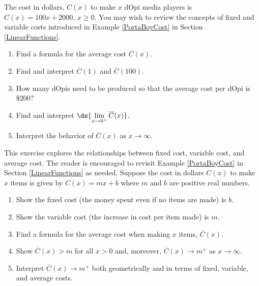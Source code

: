 \documentclass{ximera}
\begin{document}
\begin{problem}
The cost in dollars, $C(x)$ to make $x$ dOpi media players is $C(x) = 100x+2000$, $x \geq 0$.  You may wish to review the concepts of fixed and variable costs introduced in  Example \ref{PortaBoyCost} in Section \ref{LinearFunctions}.

\begin{enumerate}

\item  Find a formula for the average cost $\overline{C}(x)$.

\item  Find and interpret $\overline{C}(1)$ and $\overline{C}(100)$.

\item  How many dOpis need to be produced so that the average cost per dOpi is $\$ 200$?

\item  Find and interpret $\ds{ \lim_{x \rightarrow 0^{+}} \overline{C}(x)}$.

\item  Interpret the behavior of $\overline{C}(x)$ as $x \rightarrow \infty$.

\end{enumerate}
\end{problem}

\begin{problem}\label{averagevariablecostexercise}
This exercise explores the relationships between fixed cost, variable cost, and average cost.  The reader is encouraged to revisit Example \ref{PortaBoyCost} in Section \ref{LinearFunctions} as needed.  Suppose the cost in dollars $C(x)$ to make $x$ items is given by $C(x) = mx + b$ where $m$ and $b$ are positive real numbers.

\begin{enumerate}

\item  Show the fixed cost (the money spent even if no items are made) is $b$.
\item  Show the variable cost (the increase in cost per item made) is $m$.
\item  Find a formula for the average cost when making $x$ items, $\overline{C}(x)$.
\item  Show $\overline{C}(x) > m$ for all $x>0$ and, moreover,   $\overline{C}(x)  \rightarrow m^{+}$ as $x \rightarrow \infty$.
\item  Interpret $\overline{C}(x)  \rightarrow m^{+}$ both geometrically and in terms of fixed, variable, and average costs.

\end{enumerate}
\end{problem}
\end{document}
